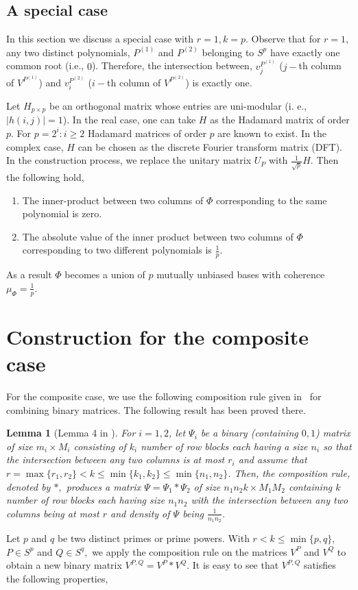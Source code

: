 \documentclass{IEEEtran}
\newtheorem{lemma}[theorem]{Lemma}
\begin{document}
\subsection{A special case}
In this section we discuss a special case with  $r=1, k=p.$ Observe that
for $r=1,$  any two distinct polynomials, $P^{(1)}$ and $P^{(2)}$ belonging
to $S^{p}$ have exactly one common root (i.e., $0$). Therefore,
the intersection between, $v^{P^{(1)}}_{j}$ ($j-$th column of  $V^{P^{(1)}}$)
and $v^{P^{(2)}}_{i}$ ($i-$th column of $V^{P^{(2)}}$) is exactly one.  

Let $H_{p\times p}$ be an orthogonal matrix whose entries are uni-modular
(i. e., $|h(i,j)|= 1$). In the real case, one can take $H$ as the Hadamard
matrix of order $p$. For $p=2^{i}: i\geq 2$ Hadamard matrices of order
$p$ are known to exist. In the complex case, $H$ can be chosen as the
discrete Fourier transform matrix (DFT). In the construction process,
we replace the unitary matrix $U_{P}$ with $\frac{1}{\sqrt{p}}H$. Then the following hold,
\begin{enumerate}
\item The inner-product between two columns of $\Phi$
  corresponding to the same polynomial is zero.
\item The absolute value of the inner product between two columns of
  $\Phi$ corresponding to two different polynomials is $\frac{1}{p}$.
\end{enumerate}
As a result $\Phi$ becomes a union of $p$ mutually unbiased bases with
coherence $\mu_{\Phi} = \frac{1}{p}$.
\section{Construction for the composite case}
\label{sec:conscomp}
For the composite case, we use the following composition
rule given in~\cite{pra_2016} for combining binary matrices. The following
result has been proved there.
\begin{lemma}[Lemma 4 in \cite{pra_2016}]
  \label{lem:comprule}
 For $i=1,2$, let $\Psi_{i}$ be a binary (containing $0,1$) matrix of size
  $m_{i} \times
  M_{i}$ consisting of $k_{i}$ number of row blocks each
  having a size $n_{i}$ so that the intersection between any two
  columns is at most $r_{i}$ and assume that
  $r = \max\{r_{1},r_{2}\} < k \leq \min\{k_{1},k_{2}\}
  \leq \min\{n_{1},n_{2}\}$. Then, the composition rule, denoted by $\ast,$
      produces a matrix $\Psi=\Psi_{1}\ast \Psi_{2}$ of size
      $n_{1}n_{2}k \times M_{1}M_{2}$ containing
      $k$ number of row blocks each having size $n_{1}n_{2}$
      with the intersection between any two columns being at most $r$ and density of $\Psi$ being $\frac{1}{n_{1}n_{2}}$.\quad
		
\end{lemma}
Let $p$ and $q$ be two distinct primes or prime powers.
With $r<k \leq \min\{p,q\},$ $P \in S^{p}$ and
$Q \in S^{q},$ we apply the composition rule on the
matrices $V^{P}$ and $V^{Q}$ to obtain a new binary matrix $V^{P,Q}=V^{P}\ast V^{Q}$.
It is easy to see that $V^{P,Q}$ satisfies the following properties,
\end{document}
